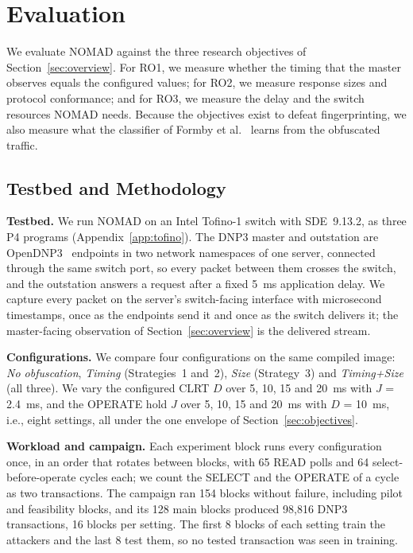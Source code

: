 \section{Evaluation}
\label{sec:evaluation}

We evaluate NOMAD against the three research objectives of Section~\ref{sec:overview}. For RO1, we measure whether the timing that the master observes equals the configured values; for RO2, we measure response sizes and protocol conformance; and for RO3, we measure the delay and the switch resources NOMAD needs. Because the objectives exist to defeat fingerprinting, we also measure what the classifier of Formby et al.~\cite{formby2016} learns from the obfuscated traffic.

\subsection{Testbed and Methodology}

\textbf{Testbed.} We run NOMAD on an Intel Tofino-1 switch with SDE~9.13.2, as three P4 programs (Appendix~\ref{app:tofino}). The DNP3 master and outstation are OpenDNP3~\cite{opendnp3} endpoints in two network namespaces of one server, connected through the same switch port, so every packet between them crosses the switch, and the outstation answers a request after a fixed 5~ms application delay. We capture every packet on the server's switch-facing interface with microsecond timestamps, once as the endpoints send it and once as the switch delivers it; the master-facing observation of Section~\ref{sec:overview} is the delivered stream.

\textbf{Configurations.} We compare four configurations on the same compiled image: \emph{No obfuscation}, \emph{Timing} (Strategies~1 and~2), \emph{Size} (Strategy~3) and \emph{Timing+Size} (all three). We vary the configured CLRT $D$ over 5, 10, 15 and 20~ms with $J$ = 2.4~ms, and the OPERATE hold $J$ over 5, 10, 15 and 20~ms with $D$ = 10~ms, i.e., eight settings, all under the one envelope of Section~\ref{sec:objectives}.

\textbf{Workload and campaign.} Each experiment block runs every configuration once, in an order that rotates between blocks, with 65 READ polls and 64 select-before-operate cycles each; we count the SELECT and the OPERATE of a cycle as two transactions. The campaign ran 154 blocks without failure, including pilot and feasibility blocks, and its 128 main blocks produced 98,816 DNP3 transactions, 16 blocks per setting. The first 8 blocks of each setting train the attackers and the last 8 test them, so no tested transaction was seen in training.

